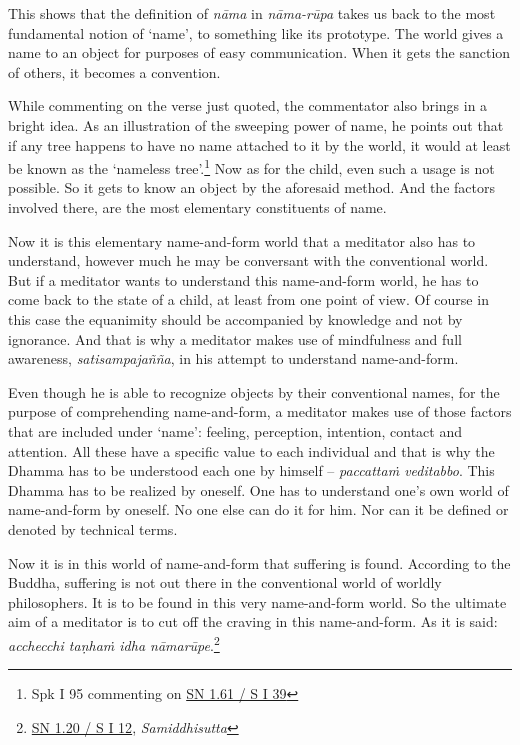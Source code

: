This shows that the definition of \emph{nāma} in \emph{nāma-rūpa} takes us back to the most fundamental notion of `name', to something like its prototype. The world gives a name to an object for purposes of easy communication. When it gets the sanction of others, it becomes a convention.

While commenting on the verse just quoted, the commentator also brings in a bright idea. As an illustration of the sweeping power of name, he points out that if any tree happens to have no name attached to it by the world, it would at least be known as the `nameless tree'.\footnote{Spk I 95 commenting on \href{https://suttacentral.net/sn1.61/pli/ms}{SN 1.61 / S I 39}} Now as for the child, even such a usage is not possible. So it gets to know an object by the aforesaid method. And the factors involved there, are the most elementary constituents of name.

Now it is this elementary name-and-form world that a meditator also has to understand, however much he may be conversant with the conventional world. But if a meditator wants to understand this name-and-form world, he has to come back to the state of a child, at least from one point of view. Of course in this case the equanimity should be accompanied by knowledge and not by ignorance. And that is why a meditator makes use of mindfulness and full awareness, \emph{satisampajañña}, in his attempt to understand name-and-form.

Even though he is able to recognize objects by their conventional names, for the purpose of comprehending name-and-form, a meditator makes use of those factors that are included under `name': feeling, perception, intention, contact and attention. All these have a specific value to each individual and that is why the Dhamma has to be understood each one by himself -- \emph{paccattaṁ veditabbo}. This Dhamma has to be realized by oneself. One has to understand one's own world of name-and-form by oneself. No one else can do it for him. Nor can it be defined or denoted by technical terms.

Now it is in this world of name-and-form that suffering is found. According to the Buddha, suffering is not out there in the conventional world of worldly philosophers. It is to be found in this very name-and-form world. So the ultimate aim of a meditator is to cut off the craving in this name-and-form. As it is said: \emph{acchecchi taṇhaṁ idha nāmarūpe}.\footnote{\href{https://suttacentral.net/sn1.20/pli/ms}{SN 1.20 / S I 12}, \emph{Samiddhisutta}}

